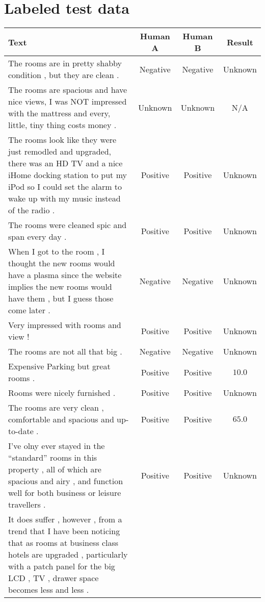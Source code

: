 \chapter{Labeled test data}
\label{chap:testData}

\begin{landscape}
\begin{center}
\small %
\begin{longtable}{m{9cm}ccc}
Text & Human A & Human B & Result \\
\hline\hline
The rooms are in pretty shabby condition , but they are clean . 
& Negative & Negative & Unknown \\ \hline
The rooms are spacious and have nice views, I was NOT impressed with the mattress and every, little, tiny thing costs money . 
& Unknown & Unknown & N/A \\ \hline
The rooms look like they were just remodled and upgraded, there was an HD TV and a nice iHome docking station to put my iPod so I could set the alarm to wake up with my music instead of the radio .
& Positive & Positive & Unknown \\ \hline
The rooms were cleaned spic and span every day .
& Positive & Positive & Unknown \\ \hline
When I got to the room , I thought the new rooms would have a plasma since the website implies the new rooms would have them , but I guess those come later .
& Negative & Negative & Unknown \\ \hline
Very impressed with rooms and view !
& Positive & Positive & Unknown \\ \hline
The rooms are not all that big .
& Negative & Negative & Unknown \\ \hline
Expensive Parking but great rooms .
& Positive & Positive & $10.0$ \\ \hline
Rooms were nicely furnished .
& Positive & Positive & Unknown \\ \hline
The rooms are very clean , comfortable and spacious and up-to-date .
& Positive & Positive & $65.0$ \\ \hline
I've olny ever stayed in the ``standard'' rooms in this property , all of which are spacious and airy , and function well for both business or leisure travellers .
& Positive & Positive & Unknown \\ \hline
It does suffer , however , from a trend that I have been noticing that as rooms at business class hotels are upgraded ,  particularly with a patch panel for the big LCD , TV , drawer space becomes less and less .

\end{longtable}
\end{center}
\end{landscape}
